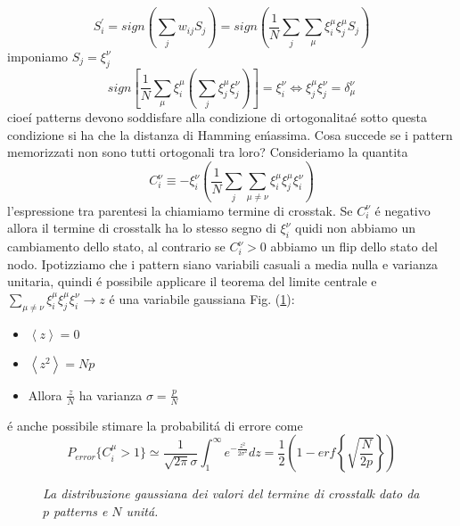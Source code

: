 \documentclass[12pt, a4paper]{book}
\theoremstyle{theorem}
\begin{document}
				\begin{equation}
					S_{i}^\prime = sign \left( \sum_{j}w_{ij} S_{j} \right)= sign \left( \frac{1}{N}\sum_{j} \sum_{\mu}\xi_{i}^{\mu}\xi_{j}^{\mu}S_{j} \right)
				\end{equation} %
				imponiamo $S_j = \xi_j^\nu$
				\begin{equation}
					sign\left[ \frac{1}{N}\sum_\mu \xi_i^\mu \left( \sum_j \xi_j^\mu \xi_j^\nu\right) \right] = \xi_i^\nu \Longleftrightarrow \xi_j^\mu \xi_j^\nu = \delta_\mu^\nu
				\end{equation} 
				cioe\' i patterns devono soddisfare alla condizione di ortogonalita\' e sotto questa condizione si ha che la distanza di Hamming e\' massima.
				Cosa succede se i pattern memorizzati non sono tutti ortogonali tra loro?
				Consideriamo la quantita\'
				\begin{equation}
					C_i^\nu \equiv -\xi^\nu_i \left( \frac{1}{N} \sum_j \sum_{\mu \neq \nu} \xi_i^\mu \xi_j^\mu \xi_i^\nu \right)
				\end{equation}
				l'espressione tra parentesi la chiamiamo termine di crosstak. Se $C_i^\nu$ \'e negativo allora il termine di crosstalk ha lo stesso segno di $\xi^\nu_i$ quidi non abbiamo un cambiamento dello stato, al contrario se $C_i^\nu>0$ abbiamo un flip dello stato del nodo. Ipotizziamo che i pattern siano variabili casuali a media nulla e varianza  unitaria, quindi \'e possibile applicare il teorema del limite centrale e $\sum_{\mu \neq \nu} \xi_i^\mu \xi_j^\mu \xi_i^\nu \rightarrow z$ \'e una variabile gaussiana Fig. (\ref{figure::gauss_hopfield}):
				\begin{itemize}
					\item $\left \langle z \right \rangle =0$
					\item $\left \langle z^2 \right \rangle =Np$
					\item Allora $\frac{z}{N}$ ha varianza $\sigma = \frac{p}{N}$
				\end{itemize}
				\'e anche possibile stimare la probabilit\'a di errore come
				\begin{equation}
					P_{error}\{ C_i^\mu > 1\} \simeq \frac{1}{\sqrt{2 \pi} \sigma} \int_1^\infty e^{-\frac{z^2}{2\sigma^2}} dz = \frac{1}{2} \left( 1 - erf\left\{ \sqrt{\frac{N}{2p}}\right\} \right)
				\end{equation}
				\begin{figure}
					\centering
					\caption{\textit{La distribuzione gaussiana dei valori del termine di crosstalk dato da $p$ patterns e $N$ unit\'a.}}
					\label{figure::gauss_hopfield}
				\end{figure}
\end{document}
